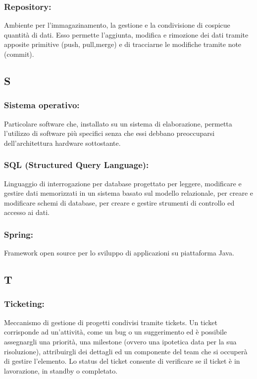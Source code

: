 \subsubsection*{Repository:} Ambiente per l'immagazinamento, la gestione e la
condivisione di cospicue quantit\`a di dati. Esso permette l'aggiunta,
 modifica e rimozione dei dati tramite apposite primitive (push, pull,merge)
  e di tracciarne le modifiche tramite note (commit).
\subsection*{\huge{S}}
\subsubsection*{Sistema operativo:} Particolare software che, installato su un
sistema di elaborazione, permetta l'utilizzo di software pi\`u specifici senza che
essi debbano preoccuparsi dell'architettura hardware sottostante.

\subsubsection*{SQL (Structured Query Language):} Linguaggio di
interrogazione per database progettato per leggere, modificare e gestire dati
memorizzati in un sistema basato sul modello relazionale, per creare e
modificare schemi di database, per creare e gestire strumenti di controllo ed
accesso ai dati.

\subsubsection*{Spring:} Framework open source per lo sviluppo di applicazioni
su piattaforma Java.

\subsection*{\huge{T}}
\subsubsection*{Ticketing:} Meccanismo di gestione di progetti condivisi tramite
tickets. Un ticket corrisponde ad un'attivit\`a, come un bug o un suggerimento
ed \`e possibile assegnargli una priorit\`a, una milestone (ovvero una ipotetica
data per la sua risoluzione), attribuirgli dei dettagli ed un componente del
team che si occuper\`a di gestire l'elemento. Lo status del ticket consente di
verificare se il ticket \`e in lavorazione, in standby o completato.

